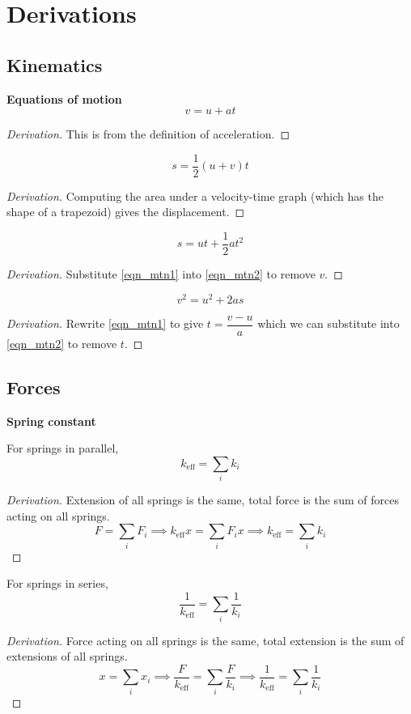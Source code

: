 \appendix
\section{Derivations}\label{appendix}
\subsection{Kinematics}
\textbf{Equations of motion}
\[ v=u+at \]
\begin{proof}[Derivation]
This is from the definition of acceleration.
\end{proof}

\[ s=\frac{1}{2}(u+v)t \]
\begin{proof}[Derivation]
Computing the area under a velocity-time graph (which has the shape of a trapezoid) gives the displacement.
\end{proof}

\[ s=ut+\frac{1}{2}at^2 \]
\begin{proof}[Derivation]
Substitute \cref{eqn_mtn1} into \cref{eqn_mtn2} to remove $v$.
\end{proof}

\[ v^2=u^2+2as \]
\begin{proof}[Derivation]
Rewrite \cref{eqn_mtn1} to give $t=\dfrac{v-u}{a}$ which we can substitute into \cref{eqn_mtn2} to remove $t$.
\end{proof}
\pagebreak

\subsection{Forces}
\textbf{Spring constant}

For springs in parallel, 
\[ k_{\text{eff}} = \sum_{i} k_i \]

\begin{proof}[Derivation]
Extension of all springs is the same, total force is the sum of forces acting on all springs.
\[ F = \sum_{i} F_i \implies k_{\text{eff}} x = \sum_{i} F_i x \implies k_{\text{eff}} = \sum_{i} k_i \]
\end{proof}

For springs in series,
\[ \frac{1}{k_{\text{eff}}} = \sum_{i} \frac{1}{k_i} \]

\begin{proof}[Derivation] Force acting on all springs is the same, total extension is the sum of extensions of all springs.
\[ x = \sum_{i} x_i \implies \frac{F}{k_{\text{eff}}} = \sum_{i} \frac{F}{k_i} \implies \frac{1}{k_{\text{eff}}} = \sum_{i} \frac{1}{k_i} \]
\end{proof}

